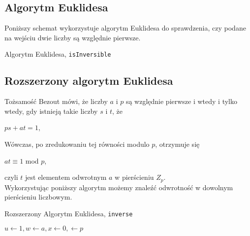 \documentclass[]{article}
\begin{document}
	\subsection{Algorytm Euklidesa}
		Poniższy schemat wykorzystuje algorytm Euklidesa do sprawdzenia, czy podane na wejściu dwie liczby są względnie pierwsze. \\
	\begin{algorithm}[H]
		\label{Euklid}
		\caption{Algorytm Euklidesa, \texttt{isInversible}}
		\BlankLine
		
	\end{algorithm}

	\subsection{Rozszerzony algorytm Euklidesa}
		Tożsamość Bezout mówi, że liczby $a$ i $p$ są względnie pierwsze i wtedy i tylko wtedy, gdy istnieją takie liczby $s$ i $t$, że
		\begin{center}
			$ps + at = 1$,
		\end{center}
		Wówczas, po zredukowaniu tej równości modulo $p$, otrzymuje się
		\begin{center}
			$at \equiv 1$ mod $p$,
		\end{center}
		 czyli $t$ jest elementem odwrotnym $a$ w pierścieniu $Z_{p}$. \\
		Wykorzystując poniższy algorytm możemy znaleźć odwrotność w dowolnym pierścieniu liczbowym.
		
		\begin{algorithm}[H]
			\label{extEuklid}
			\caption{Rozszerzony Algorytm Euklidesa, \texttt{inverse}}
			\BlankLine
			$u \leftarrow 1, w \leftarrow a, x \leftarrow 0, \leftarrow p$ \\
		\end{algorithm}
\end{document}
